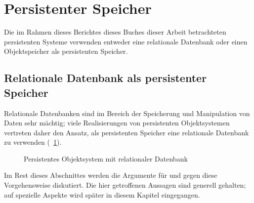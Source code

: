 \section{Persistenter Speicher}
%
Die im Rahmen \ifbericht dieses Berichtes \else\ifbuch dieses Buches
\else dieser Arbeit \fi\fi betrachteten persistenten Systeme verwenden
entweder eine relationale Datenbank oder einen Objektspeicher als
persistenten Speicher.
%
\subsection{Relationale Datenbank als persistenter Speicher}
%
Relationale Datenbanken sind im Bereich der Speicherung und
Manipulation von Daten sehr m\"{a}chtig; viele Realisierungen von
persistenten Objektsystemen vertreten daher den Ansatz, als
persistenten Speicher eine relationale Datenbank zu verwenden
(\figurename~\ref{fig:hlsecst}).
%
\begin{figure}[hbtp]%
\ifbuch%
\centerline{}%
\else%
\centerline{}%
\fi%
\caption{Persistentes Objektsystem mit relationaler
Datenbank}\label{fig:hlsecst}%
\end{figure}%
%
\par{}Im Rest dieses Abschnittes werden die Argumente f\"{u}r und gegen
diese Vorgehensweise diskutiert. Die hier getroffenen Aussagen sind
generell gehalten; auf spezielle Aspekte wird sp\"{a}ter in diesem
Kapitel eingegangen.
%
